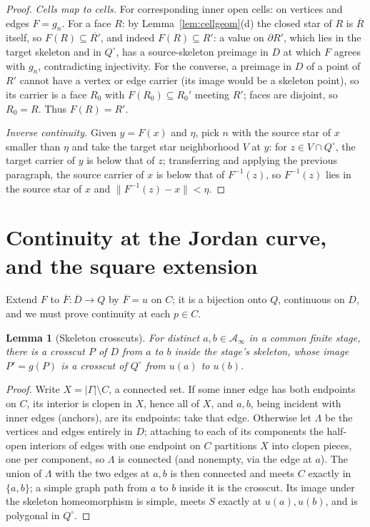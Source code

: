 \documentclass[11pt,a4paper]{article}
\theoremstyle{jsplain}
\newtheorem{lemma}[theorem]{Lemma}
\theoremstyle{jsdefn}
\begin{document}
\begin{proof}
\emph{Cells map to cells.} For corresponding inner open cells:
on vertices and edges $F=g_n$. For a face $R$: by
Lemma~\ref{lem:cellgeom}(d) the closed star of $R$ is $\overline R$
itself, so $F(R)\subseteq\overline{R'}$, and indeed
$F(R)\subseteq R'$: a value on $\partial R'$, which lies in the
target skeleton and in $Q^\circ$, has a source-skeleton preimage in
$D$ at which $F$ agrees with $g_n$, contradicting injectivity. For
the converse, a preimage in $D$ of a point of $R'$ cannot have a
vertex or edge carrier (its image would be a skeleton point), so its
carrier is a face $R_0$ with $F(R_0)\subseteq R_0'$ meeting $R'$;
faces are disjoint, so $R_0=R$. Thus $F(R)=R'$.

\emph{Inverse continuity.} Given $y=F(x)$ and $\eta$, pick $n$ with
the source star of $x$ smaller than $\eta$ and take the target star
neighborhood $V$ at $y$: for $z\in V\cap Q^\circ$, the target carrier
of $y$ is below that of $z$; transferring and applying the previous
paragraph, the source carrier of $x$ is below that of $F^{-1}(z)$, so
$F^{-1}(z)$ lies in the source star of $x$ and
$\|F^{-1}(z)-x\|<\eta$.
\end{proof}

\section{Continuity at the Jordan curve, and the square extension}\label{sec:boundary}

Extend $F$ to $\overline F:\overline D\to Q$ by $\overline F=u$ on
$C$; it is a bijection onto $Q$, continuous on $D$, and we must prove
continuity at each $p\in C$.

\begin{lemma}[Skeleton crosscuts]\label{lem:skelcross}
For distinct $a,b\in \mathcal A_\infty$ in a common finite stage, there is a
crosscut $P$ of $D$ from $a$ to $b$ inside the stage's skeleton, whose
image $P'=g(P)$ is a crosscut of $Q^\circ$ from $u(a)$ to $u(b)$.
\end{lemma}
\begin{proof}
Write $X=|\Gamma|\setminus C$, a connected set. If some inner
edge has both endpoints on $C$, its interior is clopen in $X$, hence
all of $X$, and $a,b$, being incident with inner edges
(anchors), are its endpoints: take that edge. Otherwise let $\Lambda$
be the vertices and edges entirely in $D$; attaching to each of its
components the half-open interiors of edges with one endpoint on $C$
partitions $X$ into clopen pieces, one per component, so $\Lambda$ is
connected (and nonempty, via the edge at $a$). The union of $\Lambda$
with the two edges at $a,b$ is then connected and meets $C$ exactly in
$\{a,b\}$; a simple graph path from $a$ to $b$ inside it is the
crosscut. Its image under the skeleton homeomorphism is simple, meets
$S$ exactly at $u(a),u(b)$, and is polygonal in $Q^\circ$.
\end{proof}
\end{document}
